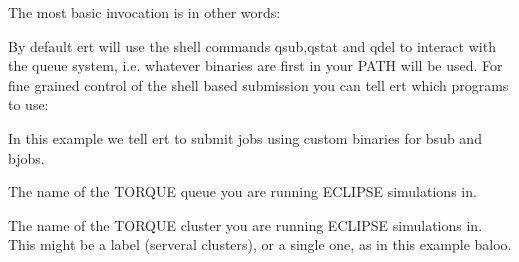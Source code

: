 \documentclass[letterpaper,10pt,english]{sphinxmanual}
\begin{document}
The most basic invocation is in other words:

%
\begin{sphinxVerbatim}[commandchars=\\\{\}]
 
\end{sphinxVerbatim}


By default ert will use the shell commands qsub,qstat and qdel to interact with
the queue system, i.e. whatever binaries are first in your PATH will be used.
For fine grained control of the shell based submission you can tell ert which
programs to use:

%
\begin{sphinxVerbatim}[commandchars=\\\{\}]
 
   
   
   
\end{sphinxVerbatim}

In this example we tell ert to submit jobs using custom binaries for bsub and
bjobs.


The name of the TORQUE queue you are running ECLIPSE simulations in.

%
\begin{sphinxVerbatim}[commandchars=\\\{\}]
   
\end{sphinxVerbatim}


The name of the TORQUE cluster you are running ECLIPSE simulations in. This
might be a label (serveral clusters), or a single one, as in this example baloo.

%
\begin{sphinxVerbatim}[commandchars=\\\{\}]
   
\end{sphinxVerbatim}
\end{document}
